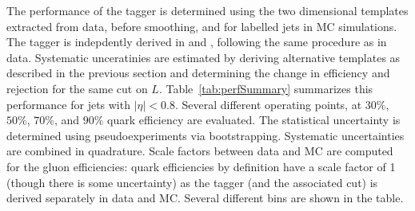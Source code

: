 The performance of the tagger is determined using the two dimensional templates extracted from data, before smoothing, and for labelled jets in MC simulations. The tagger is indepdently derived in \Pythia and \Herwigpp, following the same procedure as in data. Systematic unceratinies are estimated by deriving alternative templates as described in the previous section and determining the change in efficiency and rejection for the same cut on $L$. Table~\ref{tab:perfSummary} summarizes this performance for jets with $|\eta|<0.8$. Several different operating points, at $30\%$, $50\%$, $70\%$, and $90\%$ quark efficiency are evaluated. The statistical uncertainty is determined using pseudoexperiments via bootstrapping. Systematic uncertainties are combined in quadrature. Scale factors between data and MC are computed for the gluon efficiencies: quark efficiencies by definition have a scale factor of 1 (though there is some uncertainty) as the tagger (and the associated cut) is derived separately in data and MC. Several different \pt bins are shown in the table. 


